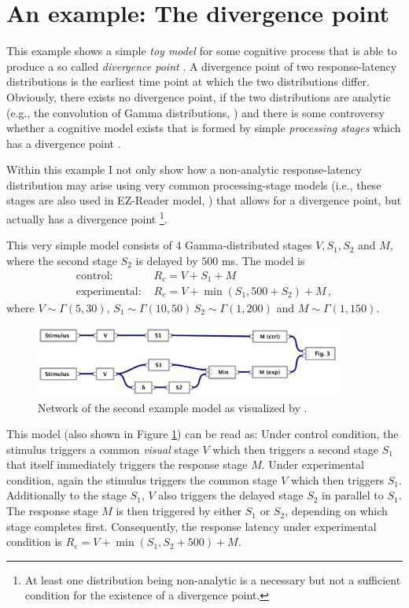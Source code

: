 \section{An example: The divergence point}
This example shows a simple \emph{toy model} for some cognitive process that is able to produce a
so called \emph{divergence point} \cite[e.g.,][]{Reingold2012}. A divergence point of two response-latency
distributions is the earliest time point at which the two distributions differ. Obviously, 
there exists no divergence point, if the two distributions are analytic 
(e.g., the convolution of Gamma distributions, \cite{Gelooven1999}) and there is some controversy
whether a cognitive model exists that is formed by simple \emph{processing stages} which has a
divergence point \cite[e.g.,][]{Gomez2016}.

Within this example I not only show how a non-analytic response-latency distribution may arise
using very common processing-stage models (i.e., these stages are also used in EZ-Reader model,
\cite{Reichle2003}) that allows for a divergence point, but actually has a divergence point%
\footnote{At least one distribution being non-analytic is a necessary but not a sufficient
condition for the existence of a divergence point.}. 

This very simple model consists of 4 Gamma-distributed stages $V, S_1, S_2$ and $M$,
where the second stage $S_2$ is delayed by $500$ ms. 
The model is
\begin{align}
 \text{control: } & R_c = V + S_1 + M \\
 \text{experimental: } & R_e = V + \min(S_1, 500+S_2) + M\,,
\end{align}
where $V \sim \Gamma(5,30),\,S_1\sim\Gamma(10,50)\,S_2\sim\Gamma(1,200)$ and $M\sim\Gamma(1,150)$.
\begin{figure}[!ht]
 \centering
 \includegraphics[width=0.9\textwidth]{fig/example2.pdf}
 \caption{Network of the second example model as visualized by .} \label{fig:example2}
\end{figure}

This model (also shown in Figure \ref{fig:example2}) can be read as: Under control condition, the
stimulus triggers a common \emph{visual} stage $V$ which then triggers a second stage $S_1$ that
itself immediately triggers the response stage $M$. Under experimental condition, again the
stimulus triggers the common stage $V$ which then triggers $S_1$. Additionally to the stage $S_1$,
$V$ also triggers the delayed stage $S_2$ in parallel to $S_1$. The response stage $M$ is then triggered by 
either $S_1$ or $S_2$, depending on which stage completes first. Consequently, the response latency
under experimental condition is $R_e = V + \min(S_1,S_2+500) + M$.


